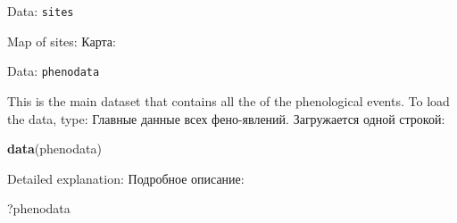 \documentclass[9pt,ignorenonframetext,aspectratio=169]{beamer}
\newenvironment{Shaded}{\begin{snugshade}}{\end{snugshade}}
\newcommand{\DataTypeTok}[1]{\textcolor[rgb]{0.13,0.29,0.53}{#1}}
\newcommand{\DecValTok}[1]{\textcolor[rgb]{0.00,0.00,0.81}{#1}}
\newcommand{\ErrorTok}[1]{\textcolor[rgb]{0.64,0.00,0.00}{\textbf{#1}}}
\newcommand{\KeywordTok}[1]{\textcolor[rgb]{0.13,0.29,0.53}{\textbf{#1}}}
\newcommand{\NormalTok}[1]{#1}
\newcommand{\OperatorTok}[1]{\textcolor[rgb]{0.81,0.36,0.00}{\textbf{#1}}}
\newcommand{\StringTok}[1]{\textcolor[rgb]{0.31,0.60,0.02}{#1}}
\begin{document}
\begin{frame}[fragile]{Data: \texttt{sites}}
\protect\hypertarget{data-sites-2}{}

\bcols

 Map of sites:  Карта: \ecols

\small

\begin{Shaded}
\end{Shaded}

\bcols{}

\ecols

\end{frame}

\begin{frame}[fragile]{Data: \texttt{phenodata}}
\protect\hypertarget{data-phenodata}{}

\bcols
{}

This is the main dataset that contains all the of the phenological
events. To load the data, type:  Главные данные всех
фено-явлений. Загружается одной строкой: \ecols

\begin{Shaded}
\begin{Highlighting}[]
\KeywordTok{data}\NormalTok{(phenodata)}
\end{Highlighting}
\end{Shaded}

\bcols
{}

Detailed explanation:  Подробное описание: \ecols

\begin{Shaded}
\begin{Highlighting}[]
\NormalTok{?phenodata}
\end{Highlighting}
\end{Shaded}

\end{frame}
\end{document}
